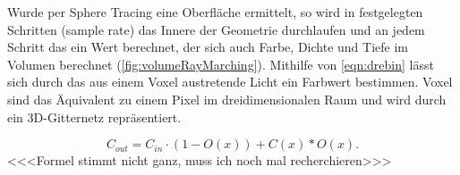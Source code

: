 Wurde per Sphere Tracing eine Oberfläche ermittelt, so wird in festgelegten Schritten (sample rate) das Innere der Geometrie durchlaufen und an jedem Schritt das
ein Wert berechnet, der sich auch Farbe, Dichte und Tiefe im Volumen berechnet (\autoref{fig:volumeRayMarching}).
Mithilfe von \autoref{eqn:drebin} \parencite{Drebin1988} lässt sich durch das aus einem Voxel austretende Licht ein Farbwert bestimmen. 
Voxel sind das Äquivalent zu einem Pixel im dreidimensionalen Raum und wird durch ein 3D-Gitternetz repräsentiert. 

\begin{equation}
	\label{eqn:drebin}
	C_{out} = C_{in} \cdot (1 - O(x)) + C(x) * O(x).
\end{equation}
<<<Formel stimmt nicht ganz, muss ich noch mal recherchieren>>>



